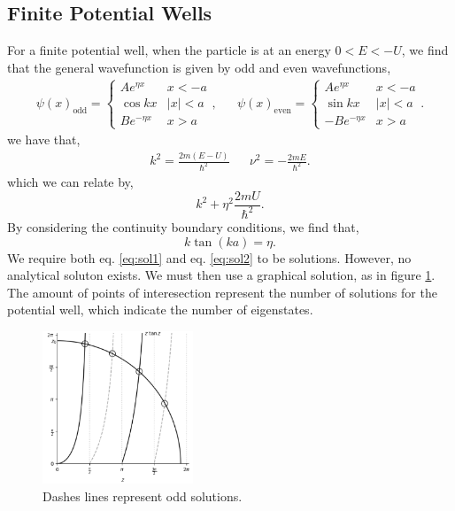 \documentclass{book}
\begin{document}
\subsection{Finite Potential Wells}
For a finite potential well, when the particle is at an energy $0 < E < -U$, we find that the general wavefunction is given by odd and even wavefunctions,
\begin{align}
	\psi(x)_{\text{odd}} = \begin{cases}
		A e^{\eta x} & x < -a\\
		\cos{kx} & |x| < a \\
		Be^{-\eta x} & x > a
	\end{cases}, && \psi(x)_{\text{even}} = \begin{cases}
	A e^{\eta x} & x < -a\\
	\sin{kx} & |x| < a \\
	-Be^{-\eta x} & x > a
	\end{cases}.
\end{align}
we have that,
\begin{align}
	k^2 = \frac{2m(E-U)}{\hbar^2} && \nu^2 = - \frac{2mE}{\hbar^2}.
\end{align}
which we can relate by,
\begin{equation}
	\boxed{k^2 + \eta^2 \frac{2mU}{\hbar^2}}. \label{eq:sol1}
\end{equation}
By considering the continuity boundary conditions, we find that,
\begin{equation}
	\boxed{k\tan{(ka)} = \eta}. \label{eq:sol2}
\end{equation}
We require both eq. \eqref{eq:sol1} and eq. \eqref{eq:sol2} to be solutions. However, no analytical soluton exists. We must then use a graphical solution, as in figure \ref{fig:graph}. The amount of points of interesection represent the number of solutions for the potential well, which indicate the number of eigenstates.
\begin{figure}
	\centering
	\includegraphics[width=0.4\textwidth]{graph.png}
	\caption{Dashes lines represent odd solutions.}
	\label{fig:graph}
\end{figure}
\end{document}

